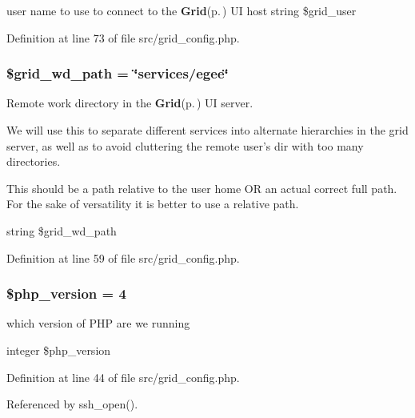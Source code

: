 user name to use to connect to the {\bf Grid}{\rm (p.\,\pageref{classGrid})} UI host  string \$grid\_\-user 



Definition at line 73 of file src/grid\_\-config.php.
\subsubsection{\setlength{\rightskip}{0pt plus 5cm}\$grid\_\-wd\_\-path = \char`\"{}services/egee\char`\"{}}\label{src_2grid__config_8php_a1}


Remote work directory in the {\bf Grid}{\rm (p.\,\pageref{classGrid})} UI server. 

We will use this to separate different services into alternate hierarchies in the grid server, as well as to avoid cluttering the remote user's dir with too many directories.

This should be a path relative to the user home OR an actual correct full path. For the sake of versatility it is better to use a relative path.

string \$grid\_\-wd\_\-path 

Definition at line 59 of file src/grid\_\-config.php.
\subsubsection{\setlength{\rightskip}{0pt plus 5cm}\$php\_\-version = 4}\label{src_2grid__config_8php_a0}


which version of PHP are we running 

integer \$php\_\-version 

Definition at line 44 of file src/grid\_\-config.php.

Referenced by ssh\_\-open().